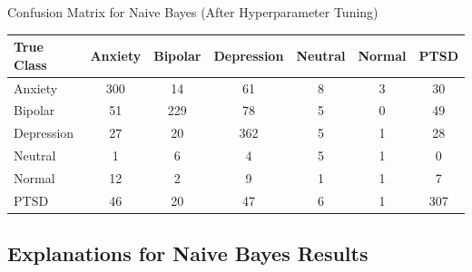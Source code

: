 \begin{center}
Confusion Matrix for Naive Bayes (After Hyperparameter Tuning)
\begin{tabular}{|l|c|c|c|c|c|c|}
\hline
\textbf{True Class} & \textbf{Anxiety} & \textbf{Bipolar} & \textbf{Depression} & \textbf{Neutral} & \textbf{Normal} & \textbf{PTSD} \\ \hline
Anxiety             & 300              & 14               & 61                  & 8                & 3               & 30            \\ \hline
Bipolar             & 51               & 229              & 78                  & 5                & 0               & 49            \\ \hline
Depression          & 27               & 20               & 362                 & 5                & 1               & 28            \\ \hline
Neutral             & 1                & 6                & 4                   & 5                & 1               & 0             \\ \hline
Normal              & 12               & 2                & 9                   & 1                & 1               & 7             \\ \hline
PTSD                & 46               & 20               & 47                  & 6                & 1               & 307           \\ \hline
\end{tabular}    
\end{center}

\subsection{Explanations for Naive Bayes Results}

